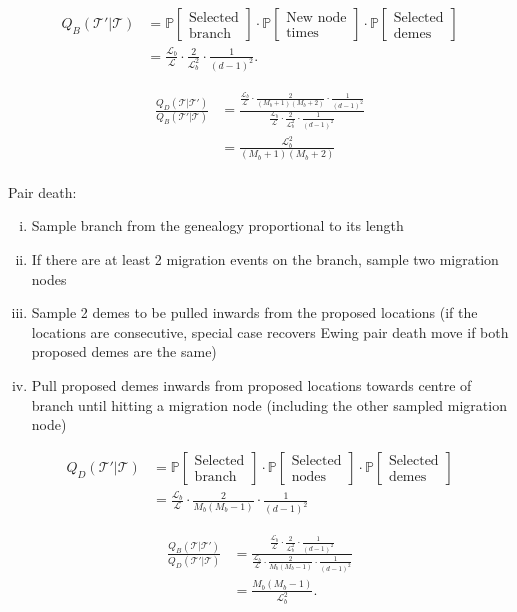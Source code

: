 \documentclass[12pt,a4paper]{article}
\newcommand{\calL}{\mathcal{L}}
\newcommand{\calT}{\mathcal{T}}
\newcommand{\bbP}{\mathbb{P}}
\begin{document}
				\begin{align*}
					Q_B (\calT' | \calT) & = \bbP[\substack{\text{Selected} \\ \text{branch}}] \cdot \bbP[\substack{\text{New node} \\ \text{times}}] \cdot \bbP[\substack{\text{Selected} \\ \text{demes}}] \\
						& = \frac{\calL_b}{\calL} \cdot \frac{2}{\calL_b^2} \cdot \frac{1}{(d-1)^2}.
				\end{align*}
			
				\begin{align*}
					\frac{Q_D(\calT | \calT')}{Q_B(\calT' | \calT)} & = \frac{\frac{\calL_b}{\calL} \cdot \frac{2}{(M_b + 1)(M_b + 2)} \cdot \frac{1}{(d-1)^2}}{\frac{\calL_b}{\calL} \cdot \frac{2}{\calL_b^2} \cdot \frac{1}{(d-1)^2}} \\
						& = \frac{\calL_b^2}{(M_b + 1) (M_b + 2)}
				\end{align*}
			\\[2ex]
			
			Pair death:
				\begin{enumerate}[(i)]
					\item Sample branch from the genealogy proportional to its length
					\item If there are at least 2 migration events on the branch, sample two migration nodes
					\item Sample 2 demes to be pulled inwards from the proposed locations (if the locations are consecutive, special case recovers Ewing pair death move if both proposed demes are the same)
					\item Pull proposed demes inwards from proposed locations towards centre of branch until hitting a migration node (including the other sampled migration node)
				\end{enumerate}
				\begin{align*}
					Q_D (\calT' | \calT) & = \bbP[\substack{\text{Selected} \\ \text{branch}}] \cdot \bbP[\substack{\text{Selected} \\ \text{nodes}}] \cdot \bbP[\substack{\text{Selected} \\ \text{demes}}] \\
						& = \frac{\calL_b}{\calL} \cdot \frac{2}{M_b (M_b - 1)} \cdot \frac{1}{(d-1)^2}
				\end{align*}
			
				\begin{align*}
					\frac{Q_B(\calT | \calT')}{Q_D (\calT' | \calT)} & = \frac{\frac{\calL_b}{\calL} \cdot \frac{2}{\calL_b^2} \cdot \frac{1}{(d-1)^2}}{\frac{\calL_b}{\calL} \cdot \frac{2}{M_b (M_b - 1)} \cdot \frac{1}{(d-1)^2}} \\
						& = \frac{M_b (M_b - 1)}{\calL_b^2}.
				\end{align*}
			
\end{document}
